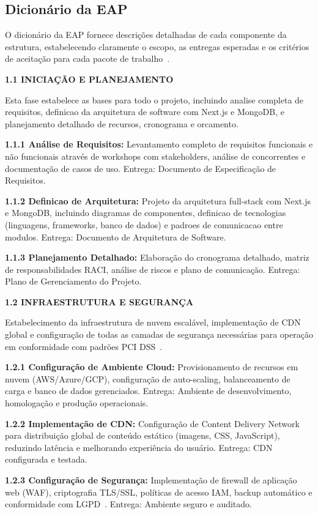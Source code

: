 \subsection{Dicionário da EAP}

O dicionário da EAP fornece descrições detalhadas de cada componente da estrutura, estabelecendo claramente o escopo, as entregas esperadas e os critérios de aceitação para cada pacote de trabalho~\cite{Verzuh:2021}.

\textbf{1.1 INICIAÇÃO E PLANEJAMENTO}

Esta fase estabelece as bases para todo o projeto, incluindo analise completa de requisitos, definicao da arquitetura de software com Next.js e MongoDB, e planejamento detalhado de recursos, cronograma e orcamento.

\textbf{1.1.1 Análise de Requisitos:} Levantamento completo de requisitos funcionais e não funcionais através de workshops com stakeholders, análise de concorrentes e documentação de casos de uso. Entrega: Documento de Especificação de Requisitos.

\textbf{1.1.2 Definicao de Arquitetura:} Projeto da arquitetura full-stack com Next.js e MongoDB, incluindo diagramas de componentes, definicao de tecnologias (linguagens, frameworks, banco de dados) e padroes de comunicacao entre modulos. Entrega: Documento de Arquitetura de Software.

\textbf{1.1.3 Planejamento Detalhado:} Elaboração do cronograma detalhado, matriz de responsabilidades RACI, análise de riscos e plano de comunicação. Entrega: Plano de Gerenciamento do Projeto.

\textbf{1.2 INFRAESTRUTURA E SEGURANÇA}

Estabelecimento da infraestrutura de nuvem escalável, implementação de CDN global e configuração de todas as camadas de segurança necessárias para operação em conformidade com padrões PCI DSS~\cite{PCIDSS:2022}.

\textbf{1.2.1 Configuração de Ambiente Cloud:} Provisionamento de recursos em nuvem (AWS/Azure/GCP), configuração de auto-scaling, balanceamento de carga e banco de dados gerenciados. Entrega: Ambiente de desenvolvimento, homologação e produção operacionais.

\textbf{1.2.2 Implementação de CDN:} Configuração de Content Delivery Network para distribuição global de conteúdo estático (imagens, CSS, JavaScript), reduzindo latência e melhorando experiência do usuário. Entrega: CDN configurada e testada.

\textbf{1.2.3 Configuração de Segurança:} Implementação de firewall de aplicação web (WAF), criptografia TLS/SSL, políticas de acesso IAM, backup automático e conformidade com LGPD~\cite{LGPD:2018}. Entrega: Ambiente seguro e auditado.

